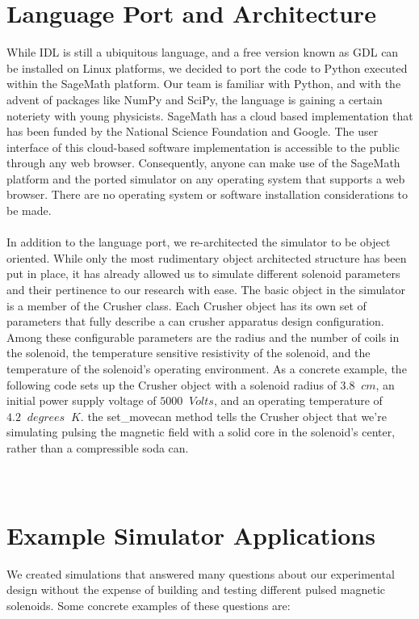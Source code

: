 \documentclass[prb,preprint]{revtex4-1}
\begin{document}
\section{Language Port and Architecture}
While IDL is still a ubiquitous language, and a free version known as GDL can be installed on Linux platforms, we decided to port the code to Python executed within the SageMath platform.  Our team is familiar with Python, and with the advent of packages like NumPy and SciPy, the language is gaining a certain noteriety with young physicists.  SageMath has a cloud based implementation that has been funded by the National Science Foundation and Google. The user interface of this cloud-based software implementation is accessible to the public through any web browser.  Consequently, anyone can make use of the SageMath platform and the ported simulator on any operating system that supports a web browser.  There are no operating system or software installation considerations to be made.
\\
\\
In addition to the language port, we re-architected the simulator to be object oriented.  While only the most rudimentary object architected structure has been put in place, it has already allowed us to simulate different solenoid parameters and their pertinence to our research with ease.  The basic object in the simulator is a member of the Crusher class.  Each Crusher object has its own set of parameters that fully describe a can crusher apparatus design configuration.  Among these configurable parameters  are the radius and the number of coils in the solenoid, the temperature sensitive resistivity of the solenoid, and the temperature of the solenoid's operating environment.  As a concrete example, the following code sets up the Crusher object with a solenoid radius of $3.8\;\;cm$, an initial power supply voltage of $5000\;\;Volts$, and an operating temperature of $4.2\;\;degrees\;\;K$.  the set\_movecan method tells the Crusher object that we're simulating pulsing the magnetic field with a solid core in the solenoid's center, rather than a compressible soda can.
\\\\\\
\section{Example Simulator Applications}
We created simulations that answered many questions about our experimental design without the expense of building and testing different pulsed magnetic solenoids.  Some concrete examples of these questions are: 
\\
\\
\end{document}
